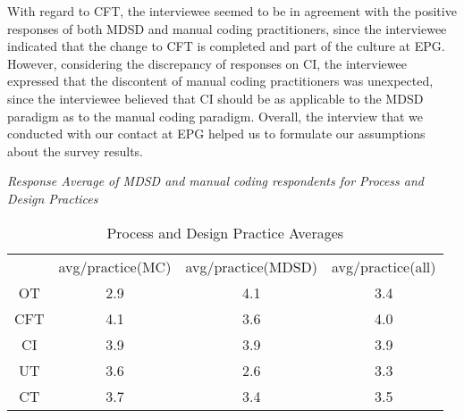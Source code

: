 \documentclass[final_report_innit.tex]{subfiles}
\newcommand\Tstrut{\rule{0pt}{2.6ex}}       %
\begin{document}
With regard to CFT, the interviewee seemed to be in agreement with the positive responses of both MDSD and manual coding practitioners, since the interviewee indicated that the change to CFT is completed and part of the culture at EPG. However, considering the discrepancy of responses on CI, the interviewee expressed that the discontent of manual coding practitioners was unexpected, since the interviewee believed that CI should be as applicable to the MDSD paradigm as to the manual coding paradigm. Overall, the interview that we conducted with our contact at EPG helped us to formulate our assumptions about the survey results. 
\\


\begin{center}\textit{Response Average of MDSD and manual coding respondents for Process and Design Practices}\end{center}

\begin{table}[h]
	\caption{Process and Design Practice Averages}
	\begin{center}
		\begin{tabular}{cccc}
		           & avg/practice(MC) & avg/practice(MDSD) & avg/practice(all) \Tstrut \\ 
		    OT  & 2.9 & 4.1 & 3.4 \Tstrut \\
		    CFT & 4.1 & 3.6 & 4.0 \Tstrut \\
			CI  & 3.9 & 3.9 & 3.9 \Tstrut \\  
			UT  & 3.6 & 2.6 & 3.3 \Tstrut \\ 
			CT  & 3.7 & 3.4 & 3.5 \Tstrut \\ 

		\end{tabular}
	\end{center}
\end{table}
\end{document}
